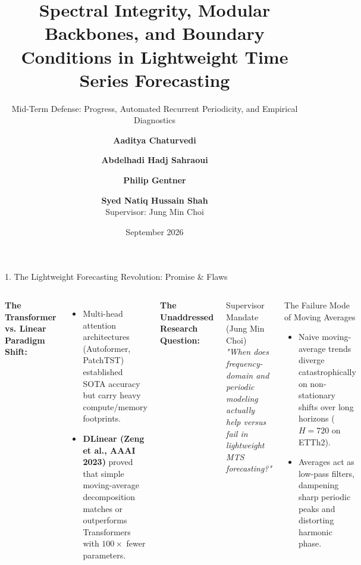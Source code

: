 \documentclass[aspectratio=169, 10pt]{beamer}
\title[\textbf{Lightweight MTS Forecasting: CycleNet-Pro}]{\textbf{Spectral Integrity, Modular Backbones, and Boundary Conditions in Lightweight Time Series Forecasting}}
\subtitle{Mid-Term Defense: Progress, Automated Recurrent Periodicity, and Empirical Diagnostics}
\author[Chaturvedi et al.]{\textbf{Aaditya Chaturvedi} \and \textbf{Abdelhadi Hadj Sahraoui} \and \textbf{Philip Gentner} \and \textbf{Syed Natiq Hussain Shah} \\ \vspace{0.15cm}\small Supervisor: Jung Min Choi}
\institute[Univ.~Hildesheim]{Information Systems and Machine Learning Lab (ISMLL) \\ Institute for Computer Science, University of Hildesheim, Germany}
\date{September 2026}
\begin{document}
\begin{frame}
  \titlepage
\end{frame}

\begin{frame}{1. The Lightweight Forecasting Revolution: Promise \& Flaws}
\begin{columns}[T]
\textbf{The Transformer vs. Linear Paradigm Shift:}
\begin{itemize}
    \item Multi-head attention architectures (Autoformer, PatchTST) established SOTA accuracy but carry heavy compute/memory footprints.
    \item \textbf{DLinear (Zeng et al., AAAI 2023)} proved that simple moving-average decomposition matches or outperforms Transformers with $100\times$ fewer parameters.
\end{itemize}
\vspace{0.3cm}
\textbf{The Unaddressed Research Question:}
\begin{block}{Supervisor Mandate (Jung Min Choi)}
\textit{"When does frequency-domain and periodic modeling actually help versus fail in lightweight MTS forecasting?"}
\end{block}

\begin{alertblock}{The Failure Mode of Moving Averages}
\begin{itemize}
    \item Naive moving-average trends diverge catastrophically on non-stationary shifts over long horizons ($H=720$ on ETTh2).
    \item Averages act as low-pass filters, dampening sharp periodic peaks and distorting harmonic phase.
\end{itemize}
\end{alertblock}
\end{columns}
\end{frame}
\end{document}
